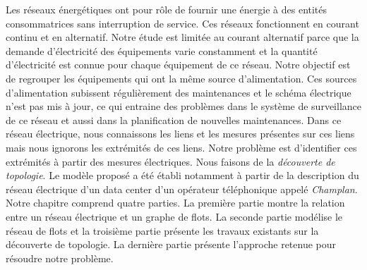 Les r\'eseaux \'energ\'etiques ont pour r\^ole de fournir une \'energie \`a des entit\'es consommatrices sans interruption de service. Ces r\'eseaux fonctionnent en courant continu et en alternatif.
\newline
Notre \'etude est limit\'ee au courant alternatif parce que la demande d'\'electricit\'e des \'equipements varie constamment et la quantit\'e d'\'electricit\'e est connue pour chaque \'equipement de ce r\'eseau. 
Notre objectif est de regrouper les \'equipements qui ont la m\^eme source d'alimentation.
Ces sources d'alimentation subissent r\'eguli\`erement des maintenances et le sch\'ema \'electrique n'est pas mis \`a jour, ce qui entraine des probl\`emes dans le syst\`eme de surveillance de ce r\'eseau et aussi dans la planification de nouvelles maintenances.
\newline
Dans ce r\'eseau \'electrique, nous connaissons les liens et les mesures pr\'esentes sur ces liens mais nous ignorons les extr\'emit\'es de ces liens. Notre probl\`eme est d'identifier ces extr\'emit\'es \`a partir des mesures \'electriques. Nous faisons de la {\em d\'ecouverte de topologie}.  
Le mod\`ele propos\'e a \'et\'e \'etabli notamment \`a partir de la description du r\'eseau \'electrique d'un data center d'un op\'erateur t\'el\'ephonique appel\'e {\em Champlan}.
 \newline
Notre chapitre comprend quatre parties. La premi\`ere partie montre la relation entre un r\'eseau \'electrique et un graphe de flots. La seconde partie mod\'elise le r\'eseau de flots et la troisi\`eme partie pr\'esente les travaux existants sur la d\'ecouverte de topologie. 
La derni\`ere partie pr\'esente l'approche retenue pour r\'esoudre notre probl\`eme.